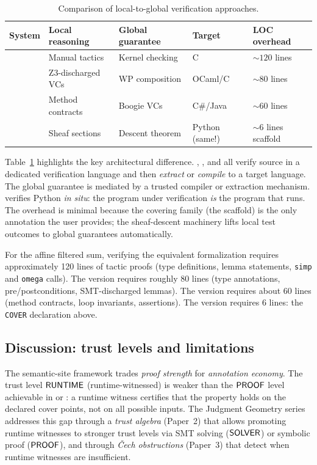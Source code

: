 \documentclass[11pt]{article}
\begin{document}
\begin{table}[t]
\centering
\caption{Comparison of local-to-global verification approaches.}
\label{tab:comparison}
\begin{tabular}{@{}lllll@{}}
\toprule
\textbf{System} & \textbf{Local reasoning} & \textbf{Global guarantee}
  & \textbf{Target} & \textbf{LOC overhead} \\
\midrule
\LEAN{}       & Manual tactics    & Kernel checking
  & C               & ${\sim}120$ lines \\
\Fstar{}      & Z3-discharged VCs & WP composition
  & OCaml/C         & ${\sim}80$ lines \\
\Dafny{}      & Method contracts  & Boogie VCs
  & C\#/Java        & ${\sim}60$ lines \\
\JuGeo{}      & Sheaf sections    & Descent theorem
  & Python (same!)  & ${\sim}6$ lines scaffold \\
\bottomrule
\end{tabular}
\end{table}

Table~\ref{tab:comparison} highlights the key architectural difference.
\LEAN, \Fstar, and \Dafny{} all verify source in a dedicated verification
language and then \emph{extract} or \emph{compile} to a target language.
The global guarantee is mediated by a trusted compiler or extraction
mechanism.  \JuGeo{} verifies Python \emph{in situ}: the program under
verification \emph{is} the program that runs.  The overhead is minimal
because the covering family (the scaffold) is the only annotation the user
provides; the sheaf-descent machinery lifts local test outcomes to global
guarantees automatically.

For the affine filtered sum, verifying the equivalent \LEAN{} formalization
requires approximately 120 lines of tactic proofs (type definitions,
lemma statements, \texttt{simp} and \texttt{omega} calls).  The \Fstar{}
version requires roughly 80 lines (type annotations, pre/postconditions,
SMT-discharged lemmas).  The \Dafny{} version requires about 60 lines
(method contracts, loop invariants, assertions).  The \JuGeo{} version
requires 6 lines: the \texttt{COVER} declaration above.

\subsection{Discussion: trust levels and limitations}

The semantic-site framework trades \emph{proof strength} for
\emph{annotation economy}.  The trust level $\mathsf{RUNTIME}$ (runtime-witnessed)
is weaker than the $\mathsf{PROOF}$ level achievable in \LEAN{} or \Coq: a runtime
witness certifies that the property holds on the declared cover points, not
on all possible inputs.  The Judgment Geometry series addresses this gap
through a \emph{trust algebra} (Paper~2) that allows promoting runtime
witnesses to stronger trust levels via SMT solving ($\mathsf{SOLVER}$) or symbolic
proof ($\mathsf{PROOF}$), and through \emph{Čech obstructions} (Paper~3) that
detect when runtime witnesses are insufficient.
\end{document}
